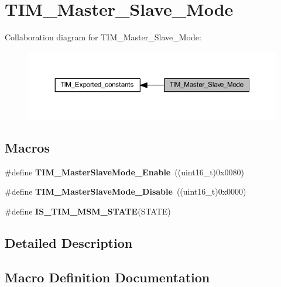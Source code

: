 \hypertarget{group___t_i_m___master___slave___mode}{}\section{T\+I\+M\+\_\+\+Master\+\_\+\+Slave\+\_\+\+Mode}
\label{group___t_i_m___master___slave___mode}
Collaboration diagram for T\+I\+M\+\_\+\+Master\+\_\+\+Slave\+\_\+\+Mode\+:\nopagebreak
\begin{figure}[H]
\begin{center}
\leavevmode
\includegraphics[width=350pt]{group___t_i_m___master___slave___mode}
\end{center}
\end{figure}
\subsection*{Macros}
\begin{DoxyCompactItemize}
\item 
\mbox{\label{group___t_i_m___master___slave___mode_gaef5da910ae6952fce424b440ea39f69a}} 
\#define {\bfseries T\+I\+M\+\_\+\+Master\+Slave\+Mode\+\_\+\+Enable}~((uint16\+\_\+t)0x0080)
\item 
\mbox{\label{group___t_i_m___master___slave___mode_ga8d4c7c0f57469f384b1327bb323d28a3}} 
\#define {\bfseries T\+I\+M\+\_\+\+Master\+Slave\+Mode\+\_\+\+Disable}~((uint16\+\_\+t)0x0000)
\item 
\#define {\bfseries I\+S\+\_\+\+T\+I\+M\+\_\+\+M\+S\+M\+\_\+\+S\+T\+A\+TE}(S\+T\+A\+TE)
\end{DoxyCompactItemize}


\subsection{Detailed Description}


\subsection{Macro Definition Documentation}
\mbox{\label{group___t_i_m___master___slave___mode_ga53146701cf287a0eca43b9232dffac60}} 
